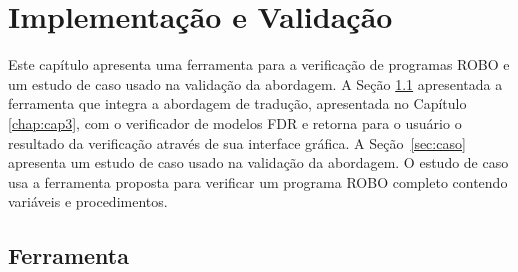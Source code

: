 \chapter{Implementação e Validação} %
\label{chap:cap4}

Este capítulo apresenta uma ferramenta para a verificação de programas ROBO e um estudo de caso usado na validação da abordagem. A Seção \ref{sec:tool} apresentada a ferramenta que integra a abordagem de tradução, apresentada no Capítulo \ref{chap:cap3}, com o verificador de modelos FDR e retorna para o usuário o resultado da verificação através de sua interface gráfica. A Seção~\ref{sec:caso} apresenta um estudo de caso usado na validação da abordagem. O estudo de caso usa a ferramenta proposta para verificar um programa ROBO completo contendo variáveis e procedimentos.

\section{Ferramenta}
\label{sec:tool}

